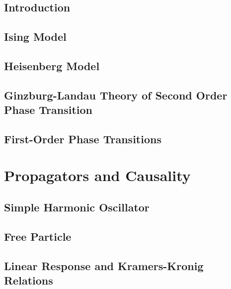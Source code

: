 \documentclass[a4paper]{article}
\theoremstyle{new}
\begin{document}
\subsection{Introduction}
\subsection{Ising Model}
\subsection{Heisenberg Model}
\subsection{Ginzburg-Landau Theory of Second Order Phase Transition}
\subsection{First-Order Phase Transitions}
\newpage
\section{Propagators and Causality}
\subsection{Simple Harmonic Oscillator}
\subsection{Free Particle}
\subsection{Linear Response and Kramers-Kronig Relations}
\end{document}
